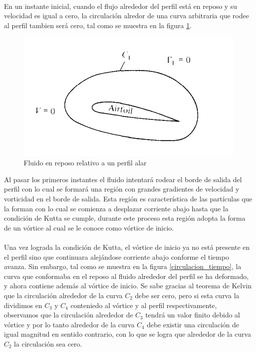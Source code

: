 \documentclass[letterpaper, openright, 12pt]{book}
\begin{document}
    \paragraph*{}
        En un instante inicial, cuando el flujo alrededor del perfil está en
        reposo y su velocidad es igual a cero, la circulación alredor de una
        curva arbitraria que rodee al perfil tambien será cero, tal como se
        muestra en la figura \ref{circulacion_reposo}.

        \begin{figure}[htbp!]
            \centering
            \includegraphics[keepaspectratio, width=115mm]{./Imagenes/circulacion_reposo}
            \caption[Fluido en reposo relativo a un perfil alar]{Fluido en
                reposo relativo a un perfil alar\cite{anderson_fundamentals}}
            \label{circulacion_reposo}
        \end{figure}

        Al pasar los primeros instantes el fluido intentará rodear el borde de
        salida del perfil con lo cual se formará una región con grandes
        gradientes de velocidad y vorticidad en el borde de salida. Esta región
        es característica de las partículas que la forman con lo cual se
        comienza a desplazar corriente abajo hasta que la condición de Kutta se
        cumple, durante este proceso esta región adopta la forma de un vórtice
        al cual se le conoce como vórtice de inicio.

    \paragraph*{}
        Una vez lograda la condición de Kutta, el vórtice de inicio ya no está
        presente en el perfil sino que continuara alejándose corriente abajo
        conforme el tiempo avanza. Sin embargo, tal como se muestra en la figura
        \ref{circulacion_tiempo}, la curva que conformaba en el reposo al fluido
        alrededor del perfil se ha deformado, y ahora contiene además al
        vórtice de inicio. Se sabe gracias al teorema de Kelvin que la
        circulación alrededor de la curva $C_2$ debe ser cero, pero si esta
        curva la dividimos en $C_3$ y $C_4$ conteniedo al vórtice y al perfil
        respectivamente, observamos que la circulación alrededor de $C_3$ tendrá
        un valor finito debido al vórtice y por lo tanto alrededor de la curva
        $C_4$ debe existir una circulación de igual magnitud en sentido
        contrario, con lo que se logra que alrededor de la curva $C_2$ la
        circulación sea cero.
\end{document}
